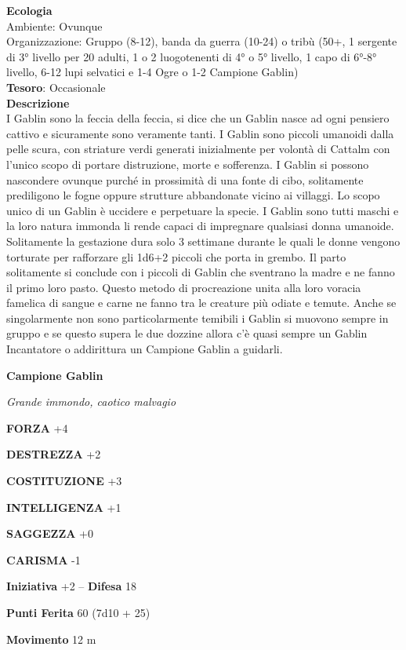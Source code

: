 \begin{multicols}{2}
\textbf{Ecologia}\\
Ambiente: Ovunque\\
Organizzazione: Gruppo (8-12), banda da guerra (10-24) o tribù (50+, 1 sergente di 3° livello per 20 adulti, 1 o 2 luogotenenti di 4° o 5° livello, 1 capo di 6°-8° livello, 6-12 lupi selvatici e 1-4 Ogre o 1-2 Campione Gablin)\\
\textbf{Tesoro}: Occasionale\\
\textbf{Descrizione}\\
I Gablin sono la feccia della feccia, si dice che un Gablin nasce ad ogni pensiero cattivo e sicuramente sono veramente tanti.
I Gablin sono piccoli umanoidi dalla pelle scura, con striature verdi generati inizialmente per volontà di Cattalm con l'unico scopo di portare distruzione, morte e sofferenza.
I Gablin si possono nascondere ovunque purché in prossimità di una fonte di cibo, solitamente prediligono le fogne oppure strutture abbandonate vicino ai villaggi.
Lo scopo unico di un Gablin è uccidere e perpetuare la specie. I Gablin sono tutti maschi e la loro natura immonda li rende capaci di impregnare qualsiasi donna umanoide.
Solitamente la gestazione dura solo 3 settimane durante le quali le donne vengono torturate per rafforzare gli 1d6+2 piccoli che porta in grembo. Il parto solitamente si conclude con i piccoli di Gablin che sventrano la madre e ne fanno il primo loro pasto.
Questo metodo di procreazione unita alla loro voracia famelica di sangue e carne ne fanno tra le creature più odiate e temute.
Anche se singolarmente non sono particolarmente temibili i Gablin si muovono sempre in gruppo e se questo supera le due dozzine allora c'è quasi sempre un Gablin Incantatore o addirittura un Campione Gablin a guidarli.


\medskip{}\textbf{Campione Gablin}

\textit{Grande immondo, caotico malvagio}

\textbf{FORZA} +4

\textbf{DESTREZZA} +2

\textbf{COSTITUZIONE} +3

\textbf{INTELLIGENZA} +1

\textbf{SAGGEZZA} +0

\textbf{CARISMA} -1

\textbf{Iniziativa} +2 -- \textbf{Difesa} 18

\textbf{Punti Ferita} 60 (7d10 + 25)

\textbf{Movimento} 12 m


\end{multicols}
